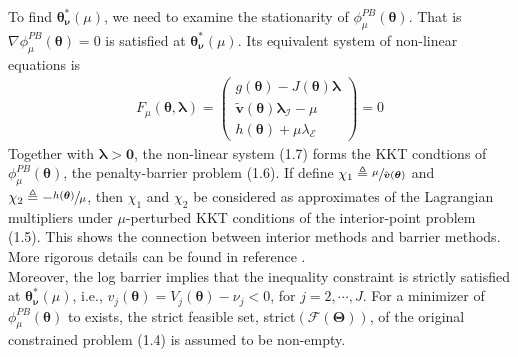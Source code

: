 \documentclass[12pt]{article}
\newcommand{\bs}{ \boldsymbol}
\newcommand{\ml}{\mathcal}
\newcommand{\lt}{\left}
\newcommand{\rt}{\right}
\begin{document}
To find $\bs{\theta}^*_{\bs{\nu}}(\mu)$, we need to examine the stationarity of $\phi_{\mu}^{PB}(\bs{\theta})$. That is $\nabla\phi_{\mu}^{PB}(\bs{\theta}) = 0$ is satisfied at $\bs{\theta}^*_{\bs{\nu}}(\mu)$. Its equivalent system of non-linear equations is
\begin{align}
F_{\mu}(\bs{\theta}, \bs{\lambda}) = 
\begin{pmatrix} g(\bs{\theta}) - J(\bs{\theta}) \bs{\lambda} \\ \tilde{\bs{v}}( \bs{\theta}) \bs{\lambda}_{\ml{I}} - \mu \\ h(\bs{\theta}) + \mu \lambda_{\ml{E}} \end{pmatrix} = 0
\end{align}
Together with $\bs{\lambda} > \bs{0}$, the non-linear system (1.7) forms the KKT condtions of $\phi^{PB}_{\mu}(\bs{\theta})$, the penalty-barrier problem (1.6). If define $\chi_1 \triangleq \sfrac{\mu}{\tilde{\bs{v}}(\bs{\theta})}$ and $\chi_2 \triangleq - \sfrac{h(\bs{\theta})}{\mu}$, then $\chi_1$ and $\chi_2$ be considered as approximates of the Lagrangian multipliers under  $\mu$-perturbed KKT conditions of the interior-point problem (1.5). This shows the connection between interior methods and barrier methods. More rigorous details can be found in reference \cite{Nocedal1999,fiacco,Forsgren2002}. \\

Moreover, the log barrier implies that the inequality constraint is strictly satisfied at $\bs{\theta}_{\bs{\nu}}^{*}(\mu)$, i.e., $v_j\lt(\bs{\theta}\rt) = V_j\lt(\bs{\theta}\rt) - \nu_j < 0$, for $j = 2, \cdots, J$. For a minimizer of $\phi^{PB}_{\mu}(\bs{\theta})$ to exists,  the strict feasible set, strict$(\ml{F}(\bs{\Theta}))$, of the original constrained problem (1.4) is assumed to be non-empty. 
\end{document}
